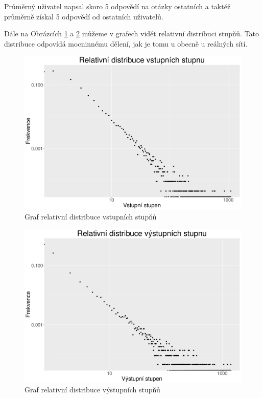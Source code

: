\documentclass[a4paper,12pt]{article}
\begin{document}
Průměrný uživatel napsal skoro 5 odpovědí na otázky ostatních a taktéž průměrně získal 5 odpovědí 
od ostatních uživatelů.

Dále na Obrázcích \ref{img:in_deg_rel} a \ref{img:out_deg_rel} můžeme v grafech vidět relativní
distribuci stupňů. Tato distribuce odpovídá mocninnému dělení, jak je tomu u obecně u reálných sítí.

\begin{figure}[h!]
\centering
\includegraphics[scale=0.4]{images/in_deg_rel.pdf}
\caption{Graf relativní distribuce vstupních stupňů}
\label{img:in_deg_rel}
\end{figure}

\begin{figure}[h!]
\centering
\includegraphics[scale=0.4]{images/out_deg_rel.pdf}
\caption{Graf relativní distribuce výstupních stupňů}
\label{img:out_deg_rel}
\end{figure}





\end{document}
